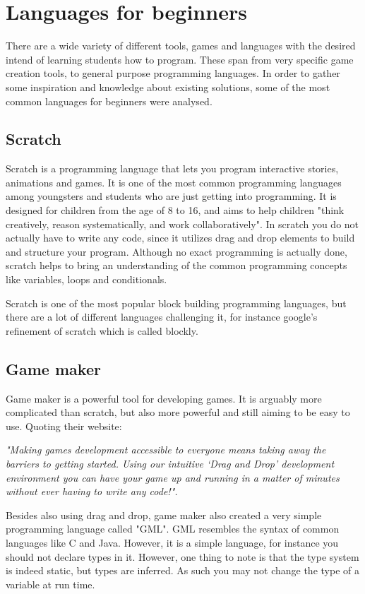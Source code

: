 \section{Languages for beginners}

There are a wide variety of different tools, games and languages with the desired intend of learning students how to program. 
These span from very specific game creation tools, to general purpose programming languages. 
In order to gather some inspiration and knowledge about existing solutions, some of the most common languages for beginners were analysed.

\subsection{Scratch}
Scratch is a programming language that lets you program interactive stories, animations and games. 
It is one of the most common programming languages among youngsters and students who are just getting into programming. 
It is designed for children from the age of 8 to 16, and aims to help children "think creatively, reason systematically, and work collaboratively". 
In scratch you do not actually have to write any code, since it utilizes drag and drop elements to build and structure your program. Although no exact programming is actually done, scratch helps to bring an understanding of the common programming concepts like variables, loops and conditionals.\cite{ScratchWebsite}

Scratch is one of the most popular block building programming languages, but there are a lot of different languages challenging it, for instance google's refinement of scratch which is called blockly.\cite{Blockly}

\subsection{Game maker}
Game maker is a powerful tool for developing games. It is arguably more complicated than scratch, but also more powerful and still aiming to be easy to use. 
Quoting their website: 

\textit{"Making games development accessible to everyone means taking away the barriers to getting started. Using our intuitive ‘Drag and Drop’ development environment you can have your game up and running in a matter of minutes without ever having to write any code!".}\cite{GameMaker}
 
Besides also using drag and drop, game maker also created a very simple programming language called "GML". 
GML resembles the syntax of common languages like C and Java. 
However, it is a simple language, for instance you should not declare types in it. 
However, one thing to note is that the type system is indeed static, but types are inferred. 
As such you may not change the type of a variable at run time.\cite{GML}

